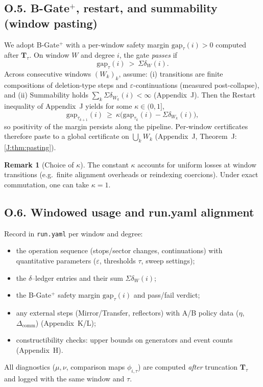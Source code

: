 \documentclass[11pt]{article}
\numberwithin{equation}{section}
\theoremstyle{plain}
\theoremstyle{definition}
\theoremstyle{remark}
\theoremstyle{plain}
\theoremstyle{definition}
\numberwithin{equation}{section}
\theoremstyle{definition}
\newtheorem{remark}[theorem]{Remark}
\numberwithin{equation}{section}
\theoremstyle{plain}
\theoremstyle{definition}
\theoremstyle{remark}
\begin{document}
\subsection*{O.5. B-Gate$^{+}$, restart, and summability (window pasting)}
We adopt B-Gate\(^{+}\) with a per-window safety margin \(\mathrm{gap}_\tau(i)>0\) computed after \(\mathbf{T}_\tau\).
On window \(W\) and degree \(i\), the gate \emph{passes} if
\[
\mathrm{gap}_\tau(i)\ >\ \Sigma\delta_W(i).
\]
Across consecutive windows \((W_k)_k\), assume:
(i) transitions are finite compositions of deletion-type steps and \(\varepsilon\)-continuations (measured post-collapse), and
(ii) Summability holds \(\sum_k \Sigma\delta_{W_k}(i)<\infty\) (Appendix~J).
Then the Restart inequality of Appendix~J yields for some \(\kappa\in(0,1]\),
\[
\mathrm{gap}_{\tau_{k+1}}(i)\ \ge\ \kappa\Big(\mathrm{gap}_{\tau_k}(i)-\Sigma\delta_{W_k}(i)\Big),
\]
so positivity of the margin persists along the pipeline.
Per-window certificates therefore paste to a global certificate on \(\bigcup_k W_k\) (Appendix~J, Theorem~J:\ref{J:thm:pasting}).

\begin{remark}[Choice of \(\kappa\)]
The constant \(\kappa\) accounts for uniform losses at window transitions (e.g.\ finite alignment overheads or reindexing coercions). Under exact commutation, one can take \(\kappa=1\).
\end{remark}

\subsection*{O.6. Windowed usage and run.yaml alignment}
Record in \texttt{run.yaml} per window and degree:
\begin{itemize}\itemsep0.25em
  \item the operation sequence (stops/sector changes, continuations) with quantitative parameters (\(\varepsilon\), thresholds \(\tau\), sweep settings);
  \item the \(\delta\)–ledger entries and their sum \(\Sigma\delta_W(i)\);
  \item the B-Gate\(^{+}\) safety margin \(\mathrm{gap}_\tau(i)\) and pass/fail verdict;
  \item any external steps (Mirror/Transfer, reflectors) with A/B policy data (\(\eta\), \(\Delta_{\mathrm{comm}}\)) (Appendix~K/L);
  \item constructibility checks: upper bounds on generators and event counts (Appendix~H).
\end{itemize}
All diagnostics (\(\mu,\nu\), comparison maps \(\phi_{i,\tau}\)) are computed \emph{after} truncation \(\mathbf{T}_\tau\) and logged with the same window and \(\tau\).
\end{document}
